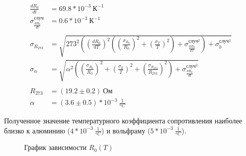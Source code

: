 \documentclass[a4paper, 12pt]{article}
\begin{document}
            \begin{align*}
                \frac{dR_0}{dt} &= 69.8 * 10^{-3}~К^{-1}\\
                \sigma_{\frac{dR_0}{dt}}^{случ} &= 0.6 * 10^{-3}~К^{-1}\\
                \\
                \sigma_{R_{273}} &= \sqrt{273^2 \left( \left( \frac{dR_0}{dT} \right)^2 \left( \left( \frac{\sigma_{R_0}}{R_0} \right)^2 + \left( \frac{\sigma_{T}}{T} \right)^2 \right) + \sigma_{\frac{dR_0}{dT}}^{случ^2} \right) + \sigma_b^{случ^2}} \\
                \sigma_{\alpha} &= \sqrt{ \alpha^2 \left( \left( \frac{\sigma_{R_0}}{R_0} \right)^2 + \left( \frac{\sigma_T}{T} \right)^2 + \left( \frac{\sigma_{R_{273}}}{R_{273}} \right)^2 \right) + \sigma_{\frac{dR_0}{dt}}^{случ^2} }\\
                \\
                R_{273} &= (19.2 \pm 0.2)~Ом\\
                \alpha &= (3.6 \pm 0.5)*10^{-3}~\frac{1}{^oC}
            \end{align*}

            Полученное значение температурного коэффициента сопротивления наиболее близко к алюминию ($4*10^{-3}~\frac{1}{^oC}$) и вольфраму ($5*10^{-3}~\frac{1}{^oC}$).

            \begin{figure}[ht]
                \caption{График зависимости $R_0(T)$}
                \label{RT_graph}
            \end{figure}
\end{document}
